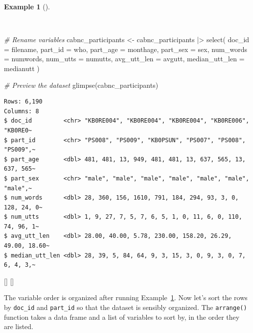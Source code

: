 \documentclass[
  letterpaper,
  krantz1]{latex/krantz-mod}
\newenvironment{Shaded}{\begin{snugshade}}{\end{snugshade}}
\newcommand{\AttributeTok}[1]{\textcolor[rgb]{0.00,0.00,0.00}{#1}}
\newcommand{\CommentTok}[1]{\textcolor[rgb]{0.00,0.00,0.00}{\textit{#1}}}
\newcommand{\FunctionTok}[1]{\textcolor[rgb]{0.00,0.00,0.00}{#1}}
\newcommand{\NormalTok}[1]{\textcolor[rgb]{0.00,0.00,0.00}{#1}}
\newcommand{\OtherTok}[1]{\textcolor[rgb]{0.00,0.00,0.00}{#1}}
\newcommand{\SpecialCharTok}[1]{\textcolor[rgb]{0.00,0.00,0.00}{#1}}
\newcommand{\cindex}[1]{%
  \StrSubstitute{#1}{_}{\_}[\temp]%
  \index{\temp}%
}
\theoremstyle{definition}
\theoremstyle{definition}
\newtheorem{example}{Example}[chapter]
\theoremstyle{remark}
\begin{document}
\begin{example}[]\protect\hypertarget{exm-curate-cabnc-rename-vars}{}\label{exm-curate-cabnc-rename-vars}

~

\begin{Shaded}
\begin{Highlighting}[numbers=left,,]
\CommentTok{\# Rename variables}
\NormalTok{cabnc\_participants }\OtherTok{\textless{}{-}}
\NormalTok{  cabnc\_participants }\SpecialCharTok{|\textgreater{}}
  \FunctionTok{select}\NormalTok{(}
    \AttributeTok{doc\_id =}\NormalTok{ filename,}
    \AttributeTok{part\_id =}\NormalTok{ who,}
    \AttributeTok{part\_age =}\NormalTok{ monthage,}
    \AttributeTok{part\_sex =}\NormalTok{ sex,}
    \AttributeTok{num\_words =}\NormalTok{ numwords,}
    \AttributeTok{num\_utts =}\NormalTok{ numutts,}
    \AttributeTok{avg\_utt\_len =}\NormalTok{ avgutt,}
    \AttributeTok{median\_utt\_len =}\NormalTok{ medianutt}
\NormalTok{  )}

\CommentTok{\# Preview the dataset}
\FunctionTok{glimpse}\NormalTok{(cabnc\_participants)}
\end{Highlighting}
\end{Shaded}

\begin{verbatim}
Rows: 6,190
Columns: 8
$ doc_id         <chr> "KB0RE004", "KB0RE004", "KB0RE004", "KB0RE006", "KB0RE0~
$ part_id        <chr> "PS008", "PS009", "KB0PSUN", "PS007", "PS008", "PS009",~
$ part_age       <dbl> 481, 481, 13, 949, 481, 481, 13, 637, 565, 13, 637, 565~
$ part_sex       <chr> "male", "male", "male", "male", "male", "male", "male",~
$ num_words      <dbl> 28, 360, 156, 1610, 791, 184, 294, 93, 3, 0, 128, 24, 0~
$ num_utts       <dbl> 1, 9, 27, 7, 5, 7, 6, 5, 1, 0, 11, 6, 0, 110, 74, 96, 1~
$ avg_utt_len    <dbl> 28.00, 40.00, 5.78, 230.00, 158.20, 26.29, 49.00, 18.60~
$ median_utt_len <dbl> 28, 39, 5, 84, 64, 9, 3, 15, 3, 0, 9, 3, 0, 7, 6, 4, 3,~
\end{verbatim}

\cindex{select()}\cindex{glimpse()}

\end{example}

The variable order is organized after running
Example~\ref{exm-curate-cabnc-rename-vars}. Now let's sort the rows by
\texttt{doc\_id} and \texttt{part\_id} so that the dataset is sensibly
organized. The \texttt{arrange()} function takes a data frame and a list
of variables to sort by, in the order they are listed.
\end{document}
